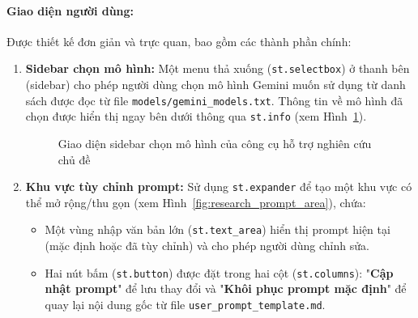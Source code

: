 \paragraph{Giao diện người dùng:} Được thiết kế đơn giản và trực quan, bao gồm các thành phần chính:
\begin{enumerate}
    \item \textbf{Sidebar chọn mô hình:} Một menu thả xuống (\texttt{st.selectbox}) ở thanh bên (sidebar) cho phép người dùng chọn mô hình Gemini muốn sử dụng từ danh sách được đọc từ file \texttt{models/gemini\_models.txt}. Thông tin về mô hình đã chọn được hiển thị ngay bên dưới thông qua \texttt{st.info} (xem Hình~\ref{fig:research_choose_model}).
    \vspace*{-4pt}
    \begin{figure}[H]
        \centering
        \caption{Giao diện sidebar chọn mô hình của công cụ hỗ trợ nghiên cứu chủ đề}
        \label{fig:research_choose_model}
    \end{figure}
    \vspace*{-18pt}

    \item \textbf{Khu vực tùy chỉnh prompt:} Sử dụng \texttt{st.expander} để tạo một khu vực có thể mở rộng/thu gọn (xem Hình~\ref{fig:research_prompt_area}), chứa:
    \begin{itemize}
        \item Một vùng nhập văn bản lớn (\texttt{st.text\_area}) hiển thị prompt hiện tại (mặc định hoặc đã tùy chỉnh) và cho phép người dùng chỉnh sửa.

        \item Hai nút bấm (\texttt{st.button}) được đặt trong hai cột (\texttt{st.columns}): "\textbf{Cập nhật prompt}" để lưu thay đổi và "\textbf{Khôi phục prompt mặc định}" để quay lại nội dung gốc từ file \texttt{user\_prompt\_template.md}.
        

\end{itemize}
\end{enumerate}
